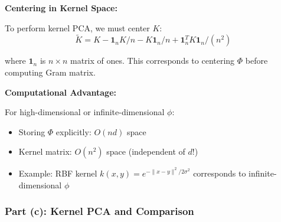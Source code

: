 \documentclass[12pt]{article}
\begin{document}
\begin{explanation}
\textbf{Centering in Kernel Space:}

To perform kernel PCA, we must center $K$:
\[
\tilde{K} = K - \mathbf{1}_n K/n - K\mathbf{1}_n/n + \mathbf{1}_n^T K \mathbf{1}_n/(n^2)
\]

where $\mathbf{1}_n$ is $n \times n$ matrix of ones. This corresponds to centering $\Phi$ before computing Gram matrix.

\textbf{Computational Advantage:}

For high-dimensional or infinite-dimensional $\phi$:
\begin{itemize}
    \item Storing $\Phi$ explicitly: $O(nd)$ space
    \item Kernel matrix: $O(n^2)$ space (independent of $d$!)
    \item Example: RBF kernel $k(x,y) = e^{-\|x-y\|^2/2\sigma^2}$ corresponds to infinite-dimensional $\phi$
\end{itemize}

\end{explanation}

\subsubsection{Part (c): Kernel PCA and Comparison}
\end{document}
